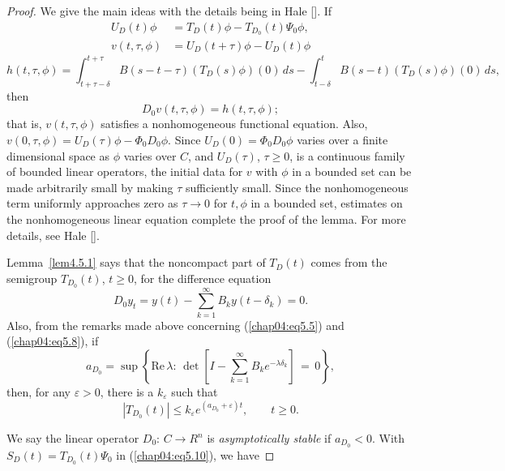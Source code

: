 \documentclass{surv-l}
\theoremstyle{plain}
\theoremstyle{definition}
\numberwithin{equation}{section}
\numberwithin{figure}{chapter}
\begin{document}
\begin{proof} We give the main ideas with the details being in Hale [\citeyear{1977h}]. If
\begin{align*}
U_{D}(t)\phi&=T_{D}(t)\phi-T_{D_{0}}(t)\Psi_{0}\phi,\\
v(t, \tau, \phi)&=U_{D}(t+\tau)\phi-U_{D}(t)\phi
\end{align*}
\begin{equation*}
h(t, \tau, \phi)=\int_{t+\tau-\delta}^{t+\tau}B(s-t-\tau)(T_{D}(s)\phi)(0)\,ds-\int_{t-\delta}^{t}B(s-t)(T_{D}(s)\phi)(0)\, ds,
\end{equation*}
then
\begin{equation*}
D_{0}v(t, \tau, \phi)=h(t, \tau, \phi);
\end{equation*}
that is, $v(t, \tau, \phi)$ satisfies a nonhomogeneous functional equation. Also, $v(0, \tau, \phi) =U_{D}(\tau)\phi-\Phi_{0}D_{0}\phi$. Since $U_{D}(0)=\Phi_{0}D_{0}\phi$ varies over a finite dimensional space as $\phi$ varies over $C$, and $U_{D}(\tau)$, $\tau\geq 0$, is a continuous family of bounded linear operators, the initial data for $v$ with $\phi$ in a bounded set can be made arbitrarily small by making $\tau$ sufficiently small. Since the nonhomogeneous term uniformly approaches zero as $\tau\rightarrow 0$ for $t, \phi$ in a bounded set, estimates on the nonhomogeneous linear equation complete the proof of the lemma. For more details, see Hale [\citeyear{1977h}].

Lemma~\ref{lem4.5.1} says that the noncompact part of $T_{D}(t)$ comes from the semigroup $T_{D_{0}}(t)$, $t\geq 0$, for the difference equation
\begin{equation}\label{chap04:eq5.11}
D_{0}y_{t}=y(t)-\sum_{k=1}^{\infty}B_{k}y(t-\delta_{k})=0.
\end{equation}
Also, from the remarks made above concerning (\ref{chap04:eq5.5}) and (\ref{chap04:eq5.8}), if
\begin{equation}\label{chap04:eq5.12}
a_{D_{0}}=\sup\left\{\mathrm{Re}\,\lambda:\,\det\left[I-\sum_{k=1}^{\infty}B_{k}e^{-\lambda\delta_{k}}\right]\,=\,0\right\},
\end{equation}
then, for any $\varepsilon >0$, there is a $k_{\varepsilon}$ such that
\begin{equation}\label{chap04:eq5.13}
|T_{D_{0}}(t)|\leq k_{\varepsilon}e^{(a_{D_{0}}+\varepsilon)t},\qquad t\geq 0.
\end{equation}

We say the linear operator $D_{0}:\,C\rightarrow R^{n}$ is \emph{asymptotically stable} if $a_{D_{0}}<0$. With $S_{D}(t)=T_{D_{0}}(t)\Psi_{0}$ in (\ref{chap04:eq5.10}), we have
\end{proof}
\end{document}
